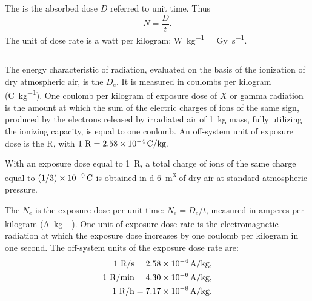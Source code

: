 The  is the absorbed dose $D$ referred to unit time. Thus 
\begin{equation*}
N = \frac{D}{t}.
\end{equation*} 
The unit of dose rate is a watt per kilogram: \si{\watt\per\kilo\gram} = \si{\gray\per\second}.


\subsection{}\label{42.7.6} The energy characteristic of radiation, evaluated on the basis of the ionization of dry atmospheric air, is the  $D_{e}$. It is measured in coulombs per kilogram (\si{\coulomb\per\kilo\gram}). One coulomb per kilogram of exposure dose of $X$ or gamma radiation is the amount at which the sum of the electric charges of ions of the same sign, produced by the electrons released by irradiated air of \SI{1}{\kilo\gram} mass, fully utilizing the ionizing capacity, is equal to one coulomb. An off-system unit of exposure dose is the  R, with $1~\text{R} = \SI{2.58d-4}{\coulomb\per\kilo\gram}$.

With an exposure dose equal to 1~R, a total charge of ions of the same charge equal to $(1/3) \times \SI{d-9}{\coulomb}$ is obtained in \SI{d-6}{\meter\cubed} of dry air at standard atmospheric pressure. 

The  $N_{e}$ is the exposure dose per unit time: $N_{e} = D_{e}/t$, measured in amperes per kilogram (\si{\ampere\per\kilo\gram}). One unit of exposure dose rate is the electromagnetic radiation at which the exposure dose increases by one coulomb per kilogram in one second. The off-system units of the exposure dose rate 
are: 
\begin{align*}%
1~\text{R/s} & = \SI{2.58d-4}{\ampere\per\kilo\gram},\\
1~\text{R/min} & = \SI{4.30d-6}{\ampere\per\kilo\gram},\\
1~\text{R/h} & = \SI{7.17d-8}{\ampere\per\kilo\gram}.
\end{align*}

